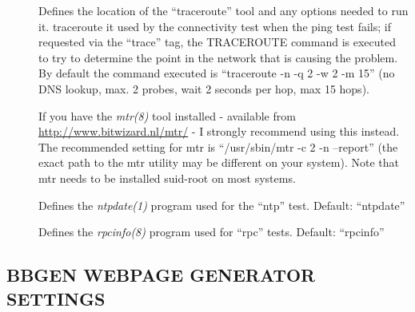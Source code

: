 \begin{description}
\item[] Defines the location of the ``traceroute''
  tool and any options needed to run it. traceroute it used by the
  connectivity test when the ping test fails; if requested via the
  ``trace'' tag, the TRACEROUTE command is executed to try to
  determine the point in the network that is causing the problem. By
  default the command executed is ``traceroute -n -q 2 -w 2 -m 15''
  (no DNS lookup, max. 2 probes, wait 2 seconds per hop, max 15
  hops). 


  If you have the \emph{mtr(8)} tool installed - available from
  \url{http://www.bitwizard.nl/mtr/} - I strongly recommend using this
  instead. The recommended setting for mtr is ``/usr/sbin/mtr -c 2 -n
  --report'' (the exact path to the mtr utility may be different on
  your system). Note that mtr needs to be installed suid-root on most
  systems. 



 

\item[] Defines the \emph{ntpdate(1)} program used for
  the ``ntp'' test. Default: ``ntpdate'' 


\item[] Defines the \emph{rpcinfo(8)}
 program used for ``rpc'' tests. Default: ``rpcinfo'' 

\end{description}

\subsection{BBGEN WEBPAGE GENERATOR SETTINGS}


